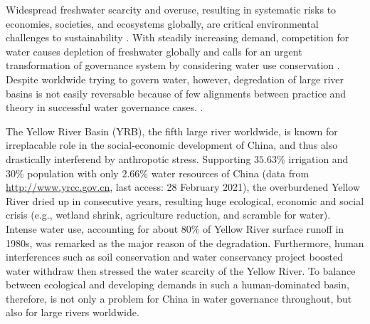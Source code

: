 Widespread freshwater scarcity and overuse, resulting in systematic risks to economies, societies, and ecosystems globally, are critical environmental challenges to sustainability \cite{distefano2017, dolan2021, xu2020b, mekonnen2016}.
With steadily increasing demand, competition for water causes depletion of freshwater globally and calls for an urgent transformation of governance system by considering water use conservation \cite{gleick2010, ziolkowska2016, wang2019d}.
Despite worldwide trying to govern water, however, degredation of large river basins is not easily reversable because of few alignments between practice and theory in successful water governance cases.
\cite{giuliani2013, falkenmark2019, jaeger2019}.

The Yellow River Basin (YRB), the fifth large river worldwide, is known for irreplacable role in the social-economic development of China, and thus also drastically interferend by anthropotic stress.
Supporting $35.63\%$ irrigation and $30\%$ population with only $2.66\%$ water resources of China (data from \href{http://www.yrcc.gov.cn}{http://www.yrcc.gov.cn}, last access: 28 February 2021), the overburdened Yellow River dried up in consecutive years, resulting huge ecological, economic and social crisis (e.g., wetland shrink, agriculture reduction, and scramble for water).
Intense water use, accounting for about $80\%$ of Yellow River surface runoff in 1980s, was remarked as the major reason of the degradation.
Furthermore, human interferences such as soil conservation and water conservancy project boosted water withdraw then stressed the water scarcity of the Yellow River.
To balance between ecological and developing demands in such a human-dominated basin, therefore, is not only a problem for China in water governance throughout, but also for large rivers worldwide.

